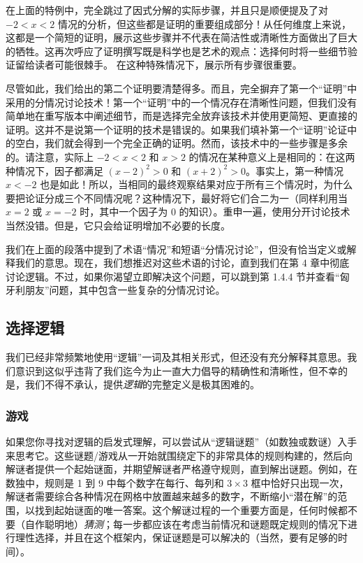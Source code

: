 在上面的特例中，完全跳过了因式分解的实际步骤，并且只是顺便提及了对 $-2 < x < 2$ 情况的分析，但这些都是证明的重要组成部分！从任何维度上来说，这都是一个简短的证明，展示这些步骤并不代表在简洁性或清晰性方面做出了巨大的牺牲。这再次呼应了证明撰写既是科学也是艺术的观点：选择何时将一些细节验证留给读者可能很棘手。 在这种特殊情况下，展示所有步骤很重要。

尽管如此，我们给出的第二个证明要清楚得多。而且，完全摒弃了第一个“证明”中采用的分情况讨论技术！第一个“证明”中的一个情况存在清晰性问题，但我们没有简单地在重写版本中阐述细节，而是选择完全放弃该技术并使用更简短、更直接的证明。这并不是说第一个证明的技术是错误的。如果我们填补第一个“证明”论证中的空白，我们就会得到一个完全正确的证明。然而，该技术中的一些步骤是多余的。请注意，实际上 $-2 < x < 2$ 和 $x > 2$ 的情况在某种意义上是相同的：在这两种情况下，因子都满足 $(x - 2)^2 > 0$ 和 $(x + 2)^2 > 0$。事实上，第一种情况 $x<-2$ 也是如此！所以，当相同的最终观察结果对应于所有三个情况时，为什么要把论证分成三个不同情况呢？这种情况下，最好将它们合二为一（同样利用当 $x = 2$ 或 $x = -2$ 时，其中一个因子为 $0$ 的知识）。重申一遍，使用分开讨论技术当然没错。但是，它只会给证明增加不必要的长度。

我们在上面的段落中提到了术语“情况”和短语“分情况讨论”，但没有恰当定义或解释我们的意思。现在，我们想推迟对这些术语的讨论，直到我们在第 4 章中彻底讨论逻辑。不过，如果你渴望立即解决这个问题，可以跳到第 1.4.4 节并查看“匈牙利朋友”问题，其中包含一些复杂的分情况讨论。

\subsection{选择逻辑}

我们已经非常频繁地使用“逻辑”一词及其相关形式，但还没有充分解释其意思。我们意识到这似乎违背了我们迄今为止一直大力倡导的精确性和清晰性，但不幸的是，我们不得不承认，提供\textit{逻辑}的完整定义是极其困难的。

\subsubsection*{游戏}

如果您你寻找对逻辑的启发式理解，可以尝试从“逻辑谜题”（如数独或数谜）入手来思考它。这些谜题/游戏从一开始就围绕定下的非常具体的规则构建的，然后向解谜者提供一个起始谜面，并期望解谜者严格遵守规则，直到解出谜题。例如，在数独中，规则是 1 到 9 中每个数字在每行、每列和 $3 \times 3$ 框中恰好只出现一次，解谜者需要综合各种情况在网格中放置越来越多的数字，不断缩小“潜在解”的范围，以找到起始谜面的唯一答案。这个解谜过程的一个重要方面是，任何时候都不要（自作聪明地）\textit{猜测}；每一步都应该在考虑当前情况和谜题既定规则的情况下进行理性选择，并且在这个框架内，保证谜题是可以解决的（当然，要有足够的时间）。

